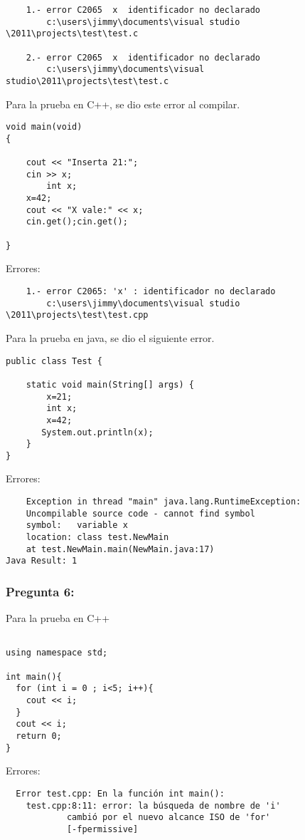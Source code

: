 \documentclass[11pt]{article}
\begin{document}
\begin{verbatim}
	1.-	error C2065  x  identificador no declarado	
		c:\users\jimmy\documents\visual studio \2011\projects\test\test.c

	2.-	error C2065  x  identificador no declarado	
		c:\users\jimmy\documents\visual studio\2011\projects\test\test.c
\end{verbatim}

Para la prueba en C++, se dio este error al compilar.


\begin{lstlisting}[frame=single]
void main(void)
{
	
	cout << "Inserta 21:";
	cin >> x;
        int x;
	x=42;
	cout << "X vale:" << x;
	cin.get();cin.get();
	
}
\end{lstlisting}

\noindent Errores:

\begin{verbatim}
	1.-	error C2065: 'x' : identificador no declarado 
		c:\users\jimmy\documents\visual studio \2011\projects\test\test.cpp
\end{verbatim}

Para la prueba en java, se dio el siguiente error.

\begin{lstlisting}[frame=single]
public class Test {

    static void main(String[] args) {
        x=21;
        int x;
        x=42;
       System.out.println(x);
    }
}
\end{lstlisting}

\noindent Errores:

\begin{verbatim}
	Exception in thread "main" java.lang.RuntimeException: 
	Uncompilable source code - cannot find symbol
 	symbol:   variable x
	location: class test.NewMain
	at test.NewMain.main(NewMain.java:17)
Java Result: 1

\end{verbatim}



\subsubsection{Pregunta 6:}
Para la prueba en C++
\begin{lstlisting}[frame=single]

using namespace std;

int main(){
  for (int i = 0 ; i<5; i++){
    cout << i;
  }
  cout << i; 
  return 0;
}
\end{lstlisting}
\noindent Errores:
\begin{verbatim}
  Error test.cpp: En la función int main():
	test.cpp:8:11: error: la búsqueda de nombre de 'i'
			cambió por el nuevo alcance ISO de 'for'
			[-fpermissive]
\end{verbatim}
\end{document}
